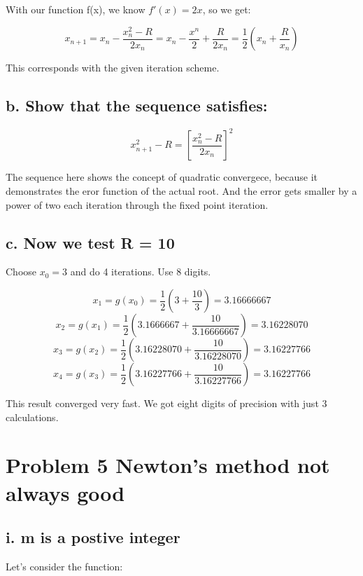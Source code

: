 \documentclass[]{article}
\begin{document}
With our function f(x), we know \(f'(x) = 2x\), so we get:

\[x_{n+1} = x_n - \frac{x_n^2 - R}{2x_n} = x_n - \frac{x^n}{2}+\frac{R}{2x_n} = \frac12(x_n+\frac{R}{x_n})\]

This corresponds with the given iteration scheme.

\hypertarget{b.-show-that-the-sequence-satisfies}{%
\subsection{b. Show that the sequence
satisfies:}\label{b.-show-that-the-sequence-satisfies}}

\[x_{n+1}^2-R = [\frac{x^2_n-R}{2x_n}]^2\]

The sequence here shows the concept of quadratic convergece, because it
demonstrates the eror function of the actual root. And the error gets
smaller by a power of two each iteration through the fixed point
iteration.

\hypertarget{c.-now-we-test-r-10}{%
\subsection{c. Now we test R = 10}\label{c.-now-we-test-r-10}}

Choose \(x_0 = 3\) and do 4 iterations. Use 8 digits.

\[x_1 = g(x_0) = \frac12(3 + \frac{10}{3}) = 3.16666667\]
\[x_2 = g(x_1) = \frac12(3.1666667 + \frac{10}{3.16666667}) = 3.16228070\]
\[x_3 = g(x_2) = \frac12(3.16228070 + \frac{10}{3.16228070}) = 3.16227766\]
\[x_4 = g(x_3) = \frac12(3.16227766 + \frac{10}{3.16227766}) = 3.16227766\]

This result converged very fast. We got eight digits of precision with
just 3 calculations.

\hypertarget{problem-5-newtons-method-not-always-good}{%
\section{Problem 5 Newton's method not always
good}\label{problem-5-newtons-method-not-always-good}}

\hypertarget{i.-m-is-a-postive-integer}{%
\subsection{i. m is a postive integer}\label{i.-m-is-a-postive-integer}}

Let's consider the function:
\end{document}
